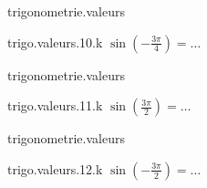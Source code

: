\begin{qcm}{trigonometrie.valeurs}
    \begin{question}{trigo.valeurs.10.k}
         \({\sin\left(-\frac{3\pi}{4}\right)}=\ldots\)
         \vspace{-1.5ex}
         \begin{multicols}{3}
            \begin{reponses}
                \lastchoices
            \end{reponses}
        \end{multicols}
    \end{question}
\end{qcm}

\begin{qcm}{trigonometrie.valeurs}
    \begin{question}{trigo.valeurs.11.k}
         \({\sin\left(\frac{3\pi}{2}\right)}=\ldots\)
         \vspace{-1.5ex}
         \begin{multicols}{3}
            \begin{reponses}
                \lastchoices
            \end{reponses}
        \end{multicols}
    \end{question}
\end{qcm}

\begin{qcm}{trigonometrie.valeurs}
    \begin{question}{trigo.valeurs.12.k}
         \({\sin\left(-\frac{3\pi}{2}\right)}=\ldots\)
         \vspace{-1.5ex}
         \begin{multicols}{3}
            \begin{reponses}
                \lastchoices
            \end{reponses}
        \end{multicols}
    \end{question}
\end{qcm}

